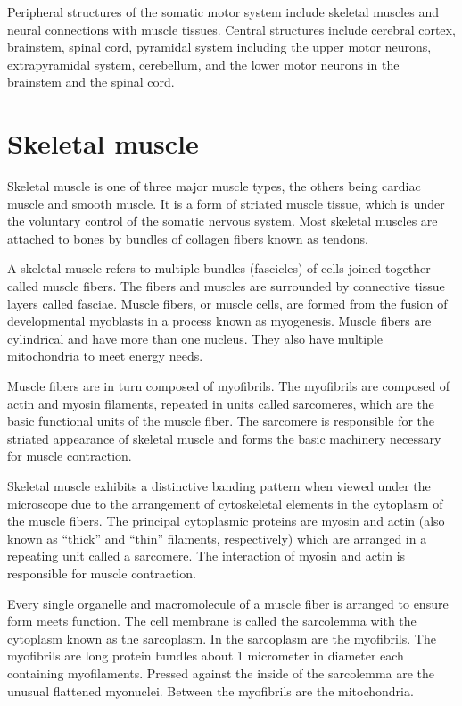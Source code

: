 \documentclass[]{book}
\begin{document}
Peripheral structures of the somatic motor system include skeletal muscles and neural connections with muscle tissues. Central structures include cerebral cortex, brainstem, spinal cord, pyramidal system including the upper motor neurons, extrapyramidal system, cerebellum, and the lower motor neurons in the brainstem and the spinal cord.

\hypertarget{skeletal-muscle}{%
\section{Skeletal muscle}\label{skeletal-muscle}}

Skeletal muscle is one of three major muscle types, the others being cardiac muscle and smooth muscle. It is a form of striated muscle tissue, which is under the voluntary control of the somatic nervous system. Most skeletal muscles are attached to bones by bundles of collagen fibers known as tendons.

A skeletal muscle refers to multiple bundles (fascicles) of cells joined together called muscle fibers. The fibers and muscles are surrounded by connective tissue layers called fasciae. Muscle fibers, or muscle cells, are formed from the fusion of developmental myoblasts in a process known as myogenesis. Muscle fibers are cylindrical and have more than one nucleus. They also have multiple mitochondria to meet energy needs.

Muscle fibers are in turn composed of myofibrils. The myofibrils are composed of actin and myosin filaments, repeated in units called sarcomeres, which are the basic functional units of the muscle fiber. The sarcomere is responsible for the striated appearance of skeletal muscle and forms the basic machinery necessary for muscle contraction.

Skeletal muscle exhibits a distinctive banding pattern when viewed under the microscope due to the arrangement of cytoskeletal elements in the cytoplasm of the muscle fibers. The principal cytoplasmic proteins are myosin and actin (also known as ``thick'' and ``thin'' filaments, respectively) which are arranged in a repeating unit called a sarcomere. The interaction of myosin and actin is responsible for muscle contraction.

Every single organelle and macromolecule of a muscle fiber is arranged to ensure form meets function. The cell membrane is called the sarcolemma with the cytoplasm known as the sarcoplasm. In the sarcoplasm are the myofibrils. The myofibrils are long protein bundles about 1 micrometer in diameter each containing myofilaments. Pressed against the inside of the sarcolemma are the unusual flattened myonuclei. Between the myofibrils are the mitochondria.
\end{document}
